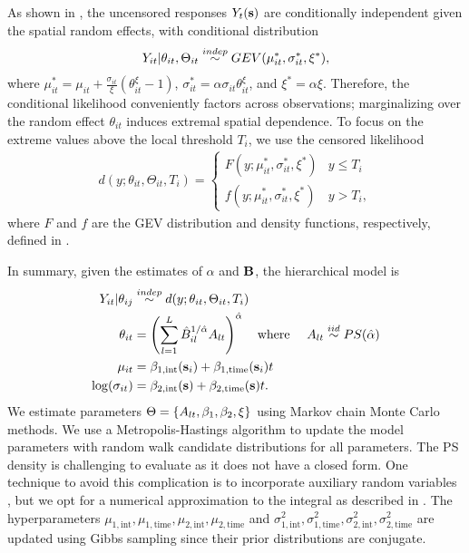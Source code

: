 As shown in \citet{Reich2012}, the uncensored responses $Y_{t}(\mathbf{s})$ are conditionally independent given the spatial random effects, with conditional distribution
\begin{align} \label{ebeq:Ycond}
   Y_{it}|\theta_{it},\Theta_{it}\stackrel{indep}{\sim} GEV(\mu^*_{it}, \sigma_{it}^*,\xi^*),
\end{align}
where $\mu_{it}^* = \mu_{it} + \frac{\sigma_{it}}{\xi}(\theta_{it}^\xi - 1)$,
$\sigma_{it}^* = \alpha\sigma_{it}\theta_{it}^\xi$, and $\xi^* = \alpha\xi$.
Therefore, the conditional likelihood conveniently factors across observations; marginalizing over the random effect $\theta_{it}$ induces extremal spatial dependence.
To focus on the extreme values above the local threshold $T_i$, we use the censored likelihood
\begin{align} \label{ebeq:g}
d(y;\theta_{it},\Theta_{it}, T_i)  =
\left\{\begin{array}{ll}
    F(y;\mu_{it}^*,\sigma_{it}^*,\xi^*) & y \le T_i \\
  f(y;\mu_{it}^*,\sigma_{it}^*,\xi^*) & y>T_i,
\end{array}\right.
\end{align}
where $F$ and $f$ are the GEV distribution and density functions, respectively, defined in .

In summary, given the estimates of $\alpha$ and $\mathbf{B}$, the hierarchical model is
\begin{align} \label{ebeq:bayesmodel}
  Y_{it} |\theta_{ij} &\stackrel{indep}{\sim} d(y;\theta_{it},\Theta_{it}, T_i) \\
  \theta_{it} &= \left(\sum_{l=1}^L{\hat B}_{il}^{1/\hat{\alpha}}A_{lt}\right)^{\hat{\alpha}}
  \text{\ \ \ where \ \ \ }
  A_{lt} \stackrel{iid}{\sim} PS(\hat{\alpha})\nonumber\\
  \mu_{it} &= \beta_{1, \text{int}}(\mathbf{s}_i) + \beta_{1, \text{time}}(\mathbf{s}_i) t \nonumber \\
  \log(\sigma_{it}) &= \beta_{2, \text{int}}(\mathbf{s}) + \beta_{2, \text{time}}(\mathbf{s}) t. \nonumber
\end{align}
We estimate parameters $\Theta = \left\{A_{lt}, \mathbf{\beta}_1, \mathbf{\beta}_2, \xi \right\}$ using Markov chain Monte Carlo methods.
We use a Metropolis-Hastings algorithm to update the model parameters with random walk candidate distributions for all parameters.
The PS density is challenging to evaluate as it does not have a closed form.
One technique to avoid this complication is to incorporate auxiliary random variables \citep{Stephenson2009}, but we opt for a numerical approximation to the integral as described in .
The hyperparameters $\mu_{1, \text{int}}, \mu_{1, \text{time}}, \mu_{2, \text{int}}, \mu_{2, \text{time}}$ and $\sigma^2_{1, \text{int}}, \sigma^2_{1, \text{time}}, \sigma^2_{2, \text{int}}, \sigma^2_{2, \text{time}}$ are updated using Gibbs sampling since their prior distributions are conjugate.

